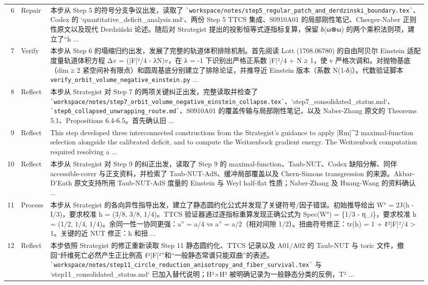 \documentclass[UTF8,fontset=fandol,zihao=-4]{ctexart}
\begin{document}
\begin{longtable}{r p{} >{\raggedright\arraybackslash}p{}}
6 & Repair & 本步从 Step 5 的符号分支争议出发，读取了 \nolinkurl{`workspace/notes/step5_regular_patch_and_derdzinski_boundary.tex`}、Codex 的 `quantitative\_deficit\_analysis.md`、两份 Step 5 TTCS 集成、S0910A01 的局部刚性笔记、Cheeger-Naber 正则性原文以及现代 Derdziński 论述。随后对 Strategist 提出的投影恒等式逐指标复算，保留 δ(ω⊗ω) 的两个乘积法则项，建立了“h ...\\
7 & Verify & 本步从 Step 6 的塌缩归约出发，发展了完整的轨道体积排除机制。首先阅读 Lott (1708.06780) 的自由阿贝尔 Einstein 适配度量轨道体积方程 Δv = (|F|²/4 - λN)v，在 λ = -1 下识别出严格正系数 |F|²/4 + N ≥ 1，使 v 严格次调和。对抛物基底（dim ≥ 2 紧空间补有限点）和圆周基底分别建立了排除论证，并推导近 Einstein 版本（系数 N(1-δ)）。代数验证脚本 \nolinkurl{verify_orbit_volume_negative_einstein.py} ...\\
8 & Reflect & 本步从 Strategist 对 Step 7 的两项关键纠正出发，完整读取并检查了 \nolinkurl{`workspace/notes/step7_orbit_volume_negative_einstein_collapse.tex`}、`step7\_consolidated\_status.md`、\nolinkurl{`step6_collapsed_unwrapping_route.md`}、S0910A01 的覆盖传输与局部刚性笔记，以及 Naber-Zhang 原文的 Theorems 5.1、Propositions 6.4-6.5。首先确认旧 ...\\
9 & Reflect & This step developed three interconnected constructions from the Strategist's guidance to apply |Rm|\textasciicircum{}2 maximal-function selection alongside the calibrated deficit, and to compute the Weitzenbock gradient energy. The Weitzenbock computation required resolving a  ...\\
10 & Reflect & 本步从 Strategist 对 Step 9 的纠正出发，读取了 Step 9 的 maximal-function、Taub-NUT、Codex 缺陷分解、同伴 accessible-cover 与正支资料，并检索了 Taub-NUT-AdS、缓冲局部覆盖以及 Chern-Simons transgression 的来源。Akbar-D’Eath 原文支持所用 Taub-NUT-AdS 度量的 Einstein 与 Weyl half-flat 性质；Naber-Zhang 及 Huang-Wang 的资料确认 ...\\
11 & Process & 本步从 Strategist 的各向异性指导出发，建立了静态圆约化公式并发现了关键符号/因子错误。初始推导给出 W⁺ = 2J(h - I/3)，要求校准 h = (3/8, 3/8, 1/4)。TTCS 验证器通过逐指标重算发现正确公式为 Spec(W⁺) = \{1/3 - η\_i\}，要求校准 h = (1/2, 1/4, 1/4)。余同一性一协同更强：a'' = a/4 vs a'' = a/2（相对间隙 1/2）。扭曲符号修正：tr(h) = 1 + ℓ²|F|²/4 > 1。关键的近 NUT 修正：h 和扭 ...\\
12 & Reflect & 本步依照 Strategist 的修正重新读取 Step 11 静态圆约化、TTCS 记录以及 A01/A02 的 Taub-NUT 与 toric 文件，撤回“纤维死亡必然产生正比例高 ℓ²|F|²”和“一般静态常谱只能双曲”的表述。\nolinkurl{`workspace/notes/step11_circle_reduction_anisotropy_and_fiber_survival.tex`} 与 `step11\_consolidated\_status.md` 已加入替代说明；H²×H² 被明确记录为一般静态分类的反例，T² ...\\

\end{longtable}
\end{document}
